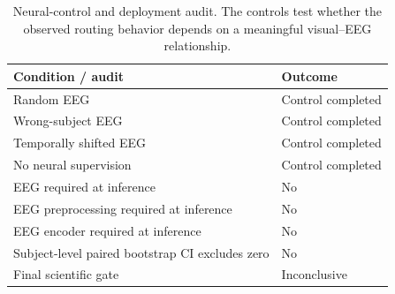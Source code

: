 
\begin{table}[t]
\centering
\caption{Neural-control and deployment audit. The controls test whether the
observed routing behavior depends on a meaningful visual--EEG relationship.}
\label{tab:controls}
\begin{tabular}{ll}
\toprule
Condition / audit & Outcome\\
\midrule
Random EEG & Control completed\\
Wrong-subject EEG & Control completed\\
Temporally shifted EEG & Control completed\\
No neural supervision & Control completed\\
EEG required at inference & No\\
EEG preprocessing required at inference & No\\
EEG encoder required at inference & No\\
Subject-level paired bootstrap CI excludes zero & No\\
Final scientific gate & Inconclusive\\
\bottomrule
\end{tabular}
\end{table}
